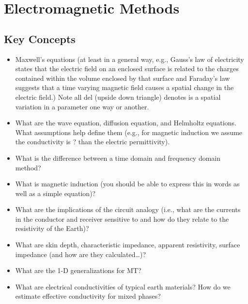 \chapter{Electromagnetic Methods}\label{ch:EMmethods}

\section{Key Concepts}
\begin{itemize}
    \item Maxwell's equations (at least in a general way, e.g., Gauss's law of electricity states that the electric field on an enclosed surface is related to the charges contained within the volume enclosed by that surface and Faraday's law suggests that a time varying magnetic field causes a spatial change in the electric field.) Note all del (upside down triangle) denotes is a spatial variation in a parameter one way or another.

    \item What are the wave equation, diffusion equation, and Helmholtz
    equations. What assumptions help define them (e.g., for magnetic induction we assume the conductivity is ? than the electric permittivity).

    \item What is the difference between a time domain and frequency domain
    method?

    \item What is magnetic induction (you should be able to express this in
    words as well as a simple equation)?

    \item What are the implications of the circuit analogy (i.e., what are the
    currents in the conductor and receiver sensitive to and how do they relate
    to the resistivity of the Earth)?

    \item What are skin depth, characteristic impedance, apparent resistivity,
    surface impedance (and how are they calculated\ldots)?

    \item What are the 1-D generalizations for MT?

    \item What are electrical conductivities of typical earth materials?  How do
    we estimate effective conductivity for mixed phases?
\end{itemize}

